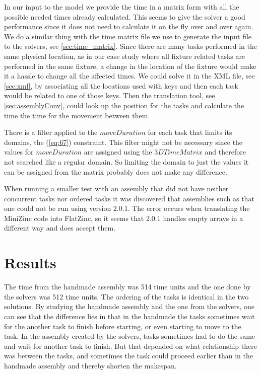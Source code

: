 In our input to the model we provide the time in a matrix form with all the possible needed times already calculated. This seems to give the solver a good performance since it does not need to calculate it on the fly over and over again. We do a similar thing with the time matrix file we use to generate the input file to the solvers, see \ref{sec:time_matrix}. Since there are many tasks performed in the same physical location, as in our case study where all fixture related tasks are performed in the same fixture, a change in the location of the fixture would make it a hassle to change all the affected times. We could solve it in the XML file, see \ref{sec:xml}, by associating all the locations used with keys and then each task would be related to one of those keys. Then the translation tool, see \ref{sec:assemblyConv}, could look up the position for the tasks and calculate the time the time for the movement between them.

There is a filter applied to the $moveDuration$ for each task that limits its domains, the (\ref{eq:67}) constraint. This filter might not be necessary since the values for $moveDuration$ are assigned using the $3DTimeMatrix$ and therefore not searched like a regular domain. So limiting the domain to just the values it can be assigned from the matrix probably does not make any difference.

When running a smaller test with an assembly that did not have neither concurrent tasks nor ordered tasks it was discovered that assemblies such as that one could not be run using version 2.0.1. The error occurs when translating the MiniZinc code into FlatZinc, so it seems that 2.0.1 handles empty arrays in a different way and does accept them.

\section{Results}
The time from the handmade assembly was 514 time units and the one done by the solvers was 512 time units. The ordering of the tasks is identical in the two solutions. By studying the handmade assembly and the one from the solvers, one can see that the difference lies in that in the handmade the tasks sometimes wait for the another task to finish before starting, or even starting to move to the task. In the assembly created by the solvers, tasks sometimes had to do the same and wait for another task to finish. But that depended on what relationship there was between the tasks, and sometimes the task could proceed earlier than in the handmade assembly and thereby shorten the makespan.

